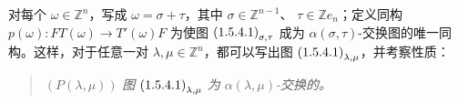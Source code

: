 对每个 $\omega\in\mathbb Z^n$，写成
$\omega=\sigma+\tau$，其中 $\sigma\in\mathbb Z^{n-1}$、
$\tau\in\mathbb Z e_n$；定义同构
$p(\omega)\colon FT(\omega)\longrightarrow T'(\omega)F$
为使图 $\textup{(1.5.4.1)}_{\sigma,\tau}$ 成为
$\alpha(\sigma,\tau)$-交换图的唯一同构。这样，对于任意一对
$\lambda,\mu\in\mathbb Z^n$，都可以写出图
$\textup{(1.5.4.1)}_{\lambda,\mu}$，并考察性质：

\begin{quote}
  \noindent\textup{$(P(\lambda,\mu))$}\quad
  \emph{图 $\textup{(1.5.4.1)}_{\lambda,\mu}$ 为
  $\alpha(\lambda,\mu)$-交换的。}
\end{quote}

